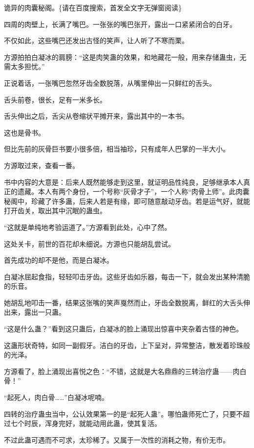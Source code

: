 
\begin{this_body}

诡异的肉囊秘阁。\{请在百度搜索，首发全文字无弹窗阅读\}

四周的肉壁上，长满了嘴巴。一张张的嘴巴张开，露出一口紧紧闭合的白牙。

不仅如此，这些嘴巴还发出古怪的笑声，让人听了不寒而栗。

方源拍拍白凝冰的肩膀：“这是肉笑蛊的效果，和地藏花一般，用来存储蛊虫，无需太多担忧。”

正说着话，一张嘴巴忽然牙齿全数脱落，从嘴里伸出一只鲜红的舌头。

舌头前卷，很长，足有一米多长。

舌头伸出之后，舌尖从卷缩状平摊开来，露出其中的一本书。

这也是骨书。

但比先前的灰骨巨书要小很多倍，相当袖珍，只有成年人巴掌的一半大小。

方源取过来，查看一番。

书中内容的大意是：后来人既然能够走到这里，就证明品性纯良，足够继承本人真正的遗藏。本人有两个身份，一个号称“灰骨才子”，一个人称“肉骨上师”。此肉囊秘阁中，珍藏了许多蛊，后来人若是有缘，即可随意敲动牙齿。若是运气好，就能打开齿关，取出其中沉眠的蛊虫。

“这就是单纯地考验运道了。”方源看到此处，心中了然。

这处关卡，前世的百花却未细说。方源也只能胡乱尝试。

首先成功的却不是他，而是白凝冰。

白凝冰屈起食指，轻轻叩击牙齿。这些牙齿如乐器，每击一下，就会发出某种清脆的乐音。

她胡乱地叩击一番，结果这张嘴的笑声戛然而止，牙齿全数脱离，鲜红的大舌头伸出来，露出一只蛊。

“这是什么蛊？”看到这只蛊后，白凝冰的脸上涌现出惊喜中夹杂着古怪的神色。

这蛊形状奇特，如同一副假牙。洁白的牙齿，上下呈对，异常整洁，散发着珍珠般的光泽。

方源看了，脸上涌现出喜悦之色：“不错，这就是大名鼎鼎的三转治疗蛊——肉白骨！”

“起死人，肉白骨……”白凝冰呢喃。

四转的治疗蛊虫当中，公认效果第一的是“起死人蛊”。哪怕蛊师死亡了，只要不超过七个时辰，浑身完好，就能动用此蛊，使其复活。

不过此蛊可遇而不可求，太珍稀了。又属于一次性的消耗之物，有价无市。


\end{this_body}
